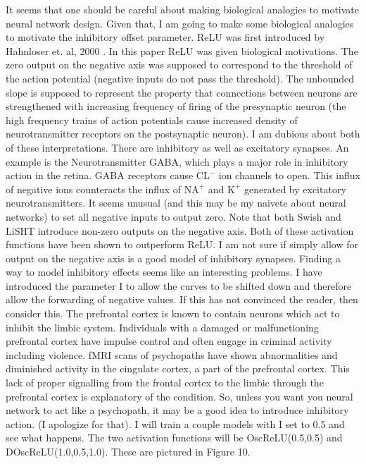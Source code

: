 \documentclass{amsart}
\theoremstyle{definition}
\theoremstyle{remark}
\numberwithin{equation}{section}
\begin{document}
It seems that one should be careful about making biological analogies to motivate neural network design. Given that, I am going to make some biological analogies to motivate the inhibitory offset parameter.  ReLU was first introduced by Hahnloser et. al, 2000 \cite{C}.  In this paper ReLU was given biological motivations.  The zero output on the negative axis was supposed to correspond to the threshold of the action potential (negative inputs do not pass the threshold).  The unbounded slope is supposed to represent the property that connections between neurons are strengthened with increasing frequency of firing of the presynaptic neuron (the high frequency trains of action potentials cause increased density of neurotransmitter receptors on the postsynaptic neuron).  I am dubious about both of these interpretations.  There are inhibitory as well as excitatory synapses.  An example is the Neurotransmitter GABA, which plays a major role in inhibitory action in the retina.  GABA receptors cause $\text{CL}^-$ ion channels to open.  This influx of negative ions counteracts the influx of $\text{NA}^+$ and $\text{K}^+$ generated by excitatory neurotransmitters.  It seems unusual (and this may be my naivete about neural networks) to set all negative inputs to output zero.  Note that both Swish and LiSHT introduce non-zero outputs on the negative axis.  Both of these activation functions have been shown to outperform  ReLU.  I am not sure if simply allow for output on the negative axis is a good model of inhibitory synapses.  Finding a way to model inhibitory effects seems like an interesting problems.  I have introduced the parameter I to allow the curves to be shifted down and therefore allow the forwarding of negative values.  If this has not convinced the reader, then consider this.  The prefrontal cortex is known to contain neurons which act to inhibit the limbic system.  Individuals with a damaged or malfunctioning prefrontal cortex have impulse control and often engage in criminal activity including violence. fMRI scans of psychopaths have shown abnormalities and diminished activity in the cingulate cortex, a part of the prefrontal cortex.  This lack of proper signalling from the frontal cortex to the limbic through the prefrontal cortex is explanatory of the condition.  So, unless you want you neural network to act like a psychopath, it may be a good idea to introduce inhibitory action.  (I apologize for that).  I will train a couple models with I set to 0.5 and see what happens.  The two activation functions will be OscReLU(0.5,0.5) and DOscReLU(1.0,0.5,1.0). These are pictured in Figure 10.  
\end{document}
